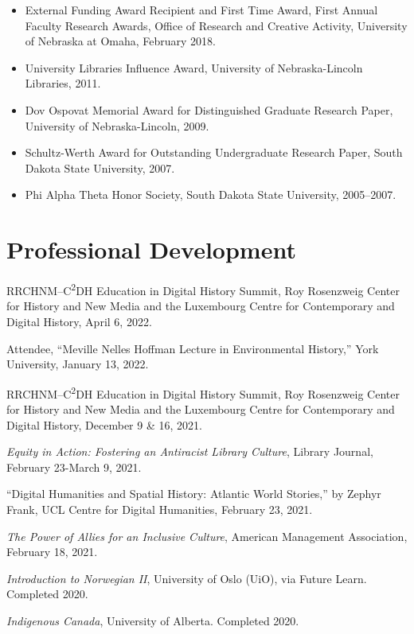 \begin{itemize}
\tightlist
\item
  External Funding Award Recipient and First Time Award, First Annual
  Faculty Research Awards, Office of Research and Creative Activity,
  University of Nebraska at Omaha, February 2018.
\item
  University Libraries Influence Award, University of Nebraska-Lincoln
  Libraries, 2011.
\item
  Dov Ospovat Memorial Award for Distinguished Graduate Research Paper,
  University of Nebraska-Lincoln, 2009.
\item
  Schultz-Werth Award for Outstanding Undergraduate Research Paper,
  South Dakota State University, 2007.
\item
  Phi Alpha Theta Honor Society, South Dakota State University,
  2005--2007.
\end{itemize}

\hypertarget{professional-development}{%
\section{Professional Development}\label{professional-development}}

RRCHNM--C\textsuperscript{2}DH Education in Digital History Summit, Roy
Rosenzweig Center for History and New Media and the Luxembourg Centre
for Contemporary and Digital History, April 6, 2022.

Attendee, ``Meville Nelles Hoffman Lecture in Environmental History,''
York University, January 13, 2022.

RRCHNM--C\textsuperscript{2}DH Education in Digital History Summit, Roy
Rosenzweig Center for History and New Media and the Luxembourg Centre
for Contemporary and Digital History, December 9 \& 16, 2021.

\emph{Equity in Action: Fostering an Antiracist Library Culture},
Library Journal, February 23-March 9, 2021.

``Digital Humanities and Spatial History: Atlantic World Stories,'' by
Zephyr Frank, UCL Centre for Digital Humanities, February 23, 2021.

\emph{The Power of Allies for an Inclusive Culture}, American Management
Association, February 18, 2021.

\emph{Introduction to Norwegian II}, University of Oslo (UiO), via
Future Learn. Completed 2020.

\emph{Indigenous Canada}, University of Alberta. Completed 2020.


